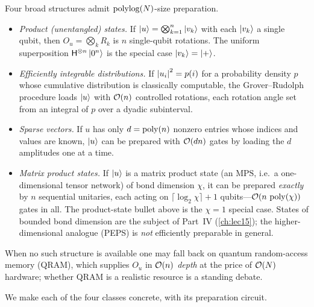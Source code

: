 \begin{example}
\label{exa:lec06-spgood}
Four broad structures admit $\operatorname{polylog}(N)$-size preparation.
\begin{itemize}[leftmargin=1.4em,nosep]
  \item \emph{Product (unentangled) states.} If $\ket{u}=\bigotimes_{k=1}^{n}
        \ket{v_k}$ with each $\ket{v_k}$ a single qubit, then $O_u=\bigotimes_k
        R_k$ is $n$ single-qubit rotations. The uniform superposition
        $\mathsf{H}^{\otimes n}\ket{0^n}$ is the special case $\ket{v_k}=\ket{+}$.
  \item \emph{Efficiently integrable distributions.} If $\left\lvert u_i \right\rvert^2=p(i)$ for a
        probability density $p$ whose cumulative distribution is classically
        computable, the Grover--Rudolph procedure loads $\ket{u}$ with $\mathcal{O}(n)$
        controlled rotations, each rotation angle set from an integral of $p$ over a
        dyadic subinterval.
  \item \emph{Sparse vectors.} If $u$ has only $d=\operatorname{poly}(n)$ nonzero entries whose
        indices and values are known, $\ket{u}$ can be prepared with $\mathcal{O}(dn)$
        gates by loading the $d$ amplitudes one at a time.
  \item \emph{Matrix product states.} If $\ket{u}$ is a matrix product state (an
        $\mathrm{MPS}$, i.e.\ a one-dimensional tensor network) of bond dimension
        $\chi$, it can be prepared \emph{exactly} by $n$ sequential unitaries, each
        acting on $\lceil\log_2\chi\rceil+1$ qubits---$\mathcal{O}(n\,\operatorname{poly}(\chi))$ gates in
        all. The product-state bullet above is the $\chi=1$ special case. States of
        bounded bond dimension are the subject of Part~IV (\cref{ch:lec15}); the
        higher-dimensional analogue (PEPS) is \emph{not} efficiently preparable in
        general.
\end{itemize}
When no such structure is available one may fall back on quantum random-access
memory (QRAM), which supplies $O_u$ in $\mathcal{O}(n)$ \emph{depth} at the price of
$\mathcal{O}(N)$ hardware; whether QRAM is a realistic resource is a standing debate.
\end{example}

We make each of the four classes concrete, with its preparation circuit.

